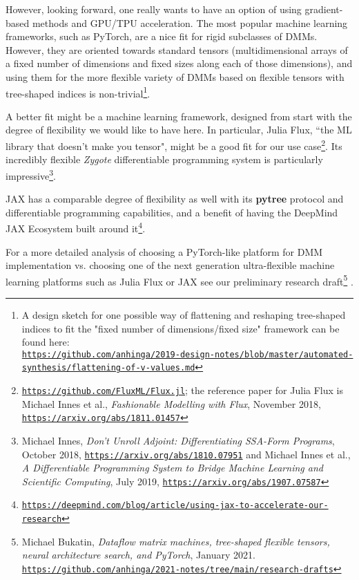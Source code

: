 \documentclass{article}
\begin{document}
However, looking forward, one really wants to have an option of using gradient-based methods and GPU/TPU
acceleration. The most popular machine learning frameworks, such as PyTorch, are a nice fit for rigid subclasses
of DMMs. However, they are oriented towards standard tensors (multidimensional arrays of a
fixed number of dimensions and fixed sizes along each of those dimensions), and using them for the more flexible variety of DMMs based on flexible tensors
with tree-shaped indices is non-trivial\footnote{A design sketch for one possible way of flattening and reshaping
tree-shaped indices to fit the "fixed number of dimensions/fixed size" framework can be found
here:\\
\href{https://github.com/anhinga/2019-design-notes/blob/master/automated-synthesis/flattening-of-v-values.md}
{\tt https://github.com/anhinga/2019-design-notes/blob/master/automated-synthesis/flattening-of-v-values.md}}.

A better fit might be a machine learning framework, designed from start with the degree of flexibility
we would like to have here. In particular, Julia Flux, ``the ML library that doesn't make you tensor", might be a good fit
for our use case\footnote{\href{https://github.com/FluxML/Flux.jl}{\tt https://github.com/FluxML/Flux.jl};
the reference paper for Julia Flux is Michael Innes et al., {\em Fashionable Modelling with Flux}, November 2018,
\href{https://arxiv.org/abs/1811.01457}{\tt https://arxiv.org/abs/1811.01457}}. Its incredibly flexible {\em Zygote}
differentiable programming system is particularly impressive\footnote{Michael Innes,
{\em Don't Unroll Adjoint: Differentiating SSA-Form Programs}, October 2018,
\href{https://arxiv.org/abs/1810.07951}{\tt https://arxiv.org/abs/1810.07951} and 
Michael Innes et al., {\em A Differentiable Programming System to Bridge Machine Learning and Scientific Computing}, 
July 2019, \href{https://arxiv.org/abs/1907.07587}{\tt https://arxiv.org/abs/1907.07587}}.

JAX has a comparable degree of flexibility as well with its {\bf pytree} protocol and differentiable programming capabilities,
and a benefit of having the DeepMind JAX Ecosystem built around 
it\footnote{\href{https://deepmind.com/blog/article/using-jax-to-accelerate-our-research}
{\tt https://deepmind.com/blog/article/using-jax-to-accelerate-our-research}}. 

For a more detailed analysis of choosing a PyTorch-like platform for DMM implementation vs. choosing one of the next generation ultra-flexible
machine learning platforms such as Julia Flux or JAX see our preliminary research 
draft\footnote{Michael Bukatin, {\em Dataflow matrix machines, tree-shaped flexible tensors, neural architecture search, 
and PyTorch}, January 2021. \href{https://github.com/anhinga/2021-notes/tree/main/research-drafts}
{\tt https://github.com/anhinga/2021-notes/tree/main/research-drafts}} . 
\end{document}
